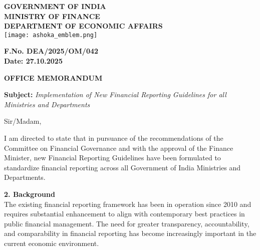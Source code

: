 \documentclass[12pt,a4paper]{article}
\newcommand{\officeline}[1]{\textbf{#1}}
\newcommand{\subjectline}[1]{\textit{#1}}
\begin{document}
\begin{center}
    {\Large \textbf{GOVERNMENT OF INDIA}}\\
    {\large \textbf{MINISTRY OF FINANCE}}\\
    {\large \textbf{DEPARTMENT OF ECONOMIC AFFAIRS}}\\[0.3cm]
    \texttt{[image: ashoka\_emblem.png]}\\[0.2cm]
\end{center}

\vspace{0.5cm}

\begin{flushright}
    \officeline{F.No. DEA/2025/OM/042}\\
    \officeline{Date: 27.10.2025}
\end{flushright}

\vspace{0.5cm}

\begin{center}
    {\Large \textbf{OFFICE MEMORANDUM}}
\end{center}

\vspace{0.5cm}

\noindent
\officeline{Subject:} \subjectline{Implementation of New Financial Reporting Guidelines for all Ministries and Departments}

\vspace{0.5cm}

Sir/Madam,

\vspace{0.3cm}

I am directed to state that in pursuance of the recommendations of the Committee on Financial Governance and with the approval of the Finance Minister, new Financial Reporting Guidelines have been formulated to standardize financial reporting across all Government of India Ministries and Departments.

\vspace{0.3cm}

\officeline{2. Background}\\
The existing financial reporting framework has been in operation since 2010 and requires substantial enhancement to align with contemporary best practices in public financial management. The need for greater transparency, accountability, and comparability in financial reporting has become increasingly important in the current economic environment.
\end{document}
